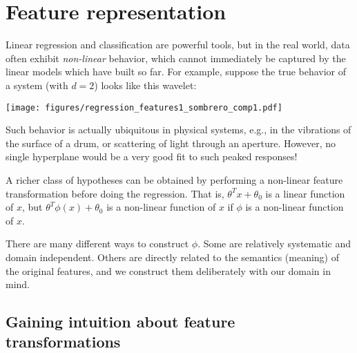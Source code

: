 \chapter{Feature representation}

\label{chap:features}

Linear regression and classification are powerful tools, but in the real world, data often
exhibit {\em non-linear} behavior, which cannot immediately be
captured by the linear models which have built so far.  For example,
suppose the true behavior of a system (with $d=2$) looks like this
wavelet: 
%

\centerline{\texttt{[image: figures/regression\_features1\_sombrero\_comp1.pdf]}}

\noindent
Such behavior is actually ubiquitous in physical systems, e.g., in the
vibrations of the surface of a drum, or scattering of light through an
aperture.  However, no single hyperplane would be a very good fit to
such peaked responses!  


A richer class of hypotheses can be obtained by performing a
non-linear feature transformation before doing the regression. That
is, $\theta^Tx + \theta_0$ is a linear function of $x$, but
$\theta^T\phi(x) + \theta_0$ is a non-linear function of $x$ if $\phi$
is a non-linear function of $x$.  

There are many different ways to construct $\phi$.  Some are
relatively systematic and domain independent.  
Others are directly related to the semantics (meaning) of the original
features, and we construct them deliberately with our domain in mind.

\section{Gaining intuition about feature transformations}

\label{sec:features_classifiers}

